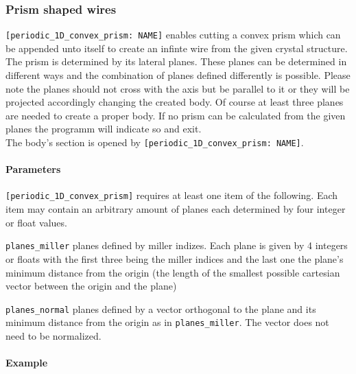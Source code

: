 \subsubsection{Prism shaped wires}
\lstinline{[periodic_1D_convex_prism: NAME]} enables cutting a convex prism which can be appended unto itself to create an infinte wire from the given crystal structure. The prism is determined by its lateral planes. These planes can be determined in different ways and the combination of planes defined differently is possible. Please note the planes should not cross with the axis but be parallel to it or they will be projected accordingly changing the created body. Of course at least three planes are needed to create a proper body. If no prism can be calculated from the given planes the programm will indicate so and exit.\\
The body's section is opened by \lstinline{[periodic_1D_convex_prism: NAME]}.

\paragraph{Parameters}
\lstinline{[periodic_1D_convex_prism]} requires at least one item of the following. Each item may contain an arbitrary amount of planes each determined by four integer or float values.

\begin{description}
 \item{\lstinline{planes_miller}} planes defined by miller indizes. Each plane is given by 4 integers or floats with the first three being the miller indices and the last one the plane's minimum distance from the origin (the length of the smallest possible cartesian vector between the origin and the plane)
 \item{\lstinline{planes_normal}} planes defined by a vector orthogonal to the plane and its minimum distance from the origin as in \lstinline{planes_miller}. The vector does not need to be normalized.
\end{description} 


\paragraph{Example}\

